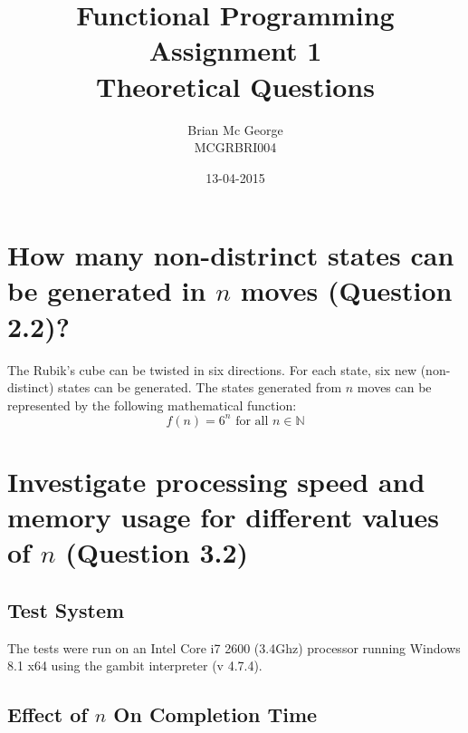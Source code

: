 \documentclass[]{article}
\title{Functional Programming Assignment 1\\Theoretical Questions}
\date{13-04-2015}
\author{Brian Mc George\\MCGRBRI004
}
\begin{document}
\maketitle
\newpage

\section{How many non-distrinct states can be generated in \(n\) moves (Question 2.2)?}
The Rubik's cube can be twisted in six directions. For each state, six new (non-distinct) states can be generated. The states generated from \(n\) moves can be represented by the following mathematical function:
\begin{equation}\label{func_states}	
	f(n)=6^n\text{ for all }n \in\mathbb{N}
\end{equation}

\section{Investigate processing speed and memory usage for different values of \(n\) (Question 3.2)}
\subsection{Test System}
The tests were run on an Intel Core i7 2600 (3.4Ghz) processor running Windows 8.1 x64 using the gambit interpreter (v 4.7.4).

\subsection{Effect of \(n\) On Completion Time}
\end{document}
